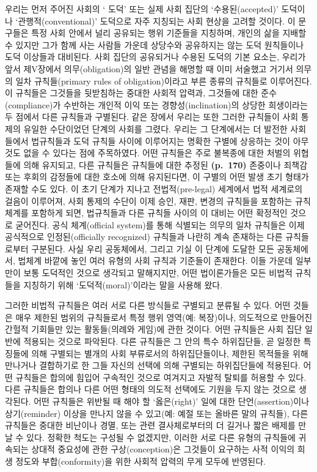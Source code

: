 우리는 먼저 주어진 사회의 ‘ 도덕’ 또는 실제 사회 집단의
‘수용된(accepted)’ 도덕이나 ‘관행적(conventional)’ 도덕으로 자주
지칭되는 사회 현상을 고려할 것이다. 이 문구들은 특정 사회 안에서 널리
공유되는 행위 기준들을 지칭하며, 개인의 삶을 지배할 수 있지만 그가 함께
사는 사람들 가운데 상당수와 공유하지는 않는 도덕 원칙들이나 도덕
이상들과 대비된다. 사회 집단의 공유되거나 수용된 도덕의 기본 요소는,
우리가 앞서 제V장에서 의무(obligation)의 일반 관념을 해명할 때 이미
서술했고 거기서 의무의 일차 규칙들(primary rules of obligation)이라고
부른 종류의 규칙들로 이루어진다. 이 규칙들은 그것들을 뒷받침하는 중대한
사회적 압력과, 그것들에 대한 준수(compliance)가 수반하는 개인적 이익
또는 경향성(inclination)의 상당한 희생이라는 두 점에서 다른 규칙들과
구별된다. 같은 장에서 우리는 또한 그러한 규칙들이 사회 통제의 유일한
수단이었던 단계의 사회를 그렸다. 우리는 그 단계에서는 더 발전한
사회들에서 법규칙들과 도덕 규칙들 사이에 이루어지는 명확한 구별에
상응하는 것이 아무것도 없을 수 있다는 점에 주목하였다. 어떤 규칙들은
주로 불복종에 대한 처벌의 위협들에 의해 유지되고, 다른 규칙들은 규칙들에
대한 추정된 \textbf{(p.~170)} 존중이나 죄책감 또는 후회의 감정들에 대한
호소에 의해 유지된다면, 이 구별의 어떤 발생 초기 형태가 존재할 수도
있다. 이 초기 단계가 지나고 전법적(pre-legal) 세계에서 법적 세계로의
걸음이 이루어져, 사회 통제의 수단이 이제 승인, 재판, 변경의 규칙들을
포함하는 규칙 체계를 포함하게 되면, 법규칙들과 다른 규칙들 사이의 이
대비는 어떤 확정적인 것으로 굳어진다. 공식 체계(official system)를 통해
식별되는 의무의 일차 규칙들은 이제 공식적으로 인정된(officially
recognized) 규칙들과 나란히 계속 존재하는 다른 규칙들로부터 구분된다.
사실 우리 공동체에서, 그리고 기실 이 단계에 도달한 모든 공동체에서,
법체계 바깥에 놓인 여러 유형의 사회 규칙과 기준들이 존재한다. 이들
가운데 일부만이 보통 도덕적인 것으로 생각되고 말해지지만, 어떤
법이론가들은 모든 비법적 규칙들을 지칭하기 위해 ‘도덕적(moral)’이라는
말을 사용해 왔다.

그러한 비법적 규칙들은 여러 서로 다른 방식들로 구별되고 분류될 수 있다.
어떤 것들은 매우 제한된 범위의 규칙들로서 특정 행위 영역(예: 복장)이나,
의도적으로 만들어진 간헐적 기회들만 있는 활동들(의례와 게임)에 관한
것이다. 어떤 규칙들은 사회 집단 일반에 적용되는 것으로 파악된다. 다른
규칙들은 그 안의 특수 하위집단들, 곧 일정한 특징들에 의해 구별되는
별개의 사회 부류로서의 하위집단들이나, 제한된 목적들을 위해 만나거나
결합하기로 한 그들 자신의 선택에 의해 구별되는 하위집단들에 적용된다.
어떤 규칙들은 합의에 힘입어 구속적인 것으로 여겨지고 자발적 탈퇴를
허용할 수 있다. 다른 규칙들은 합의나 다른 어떤 형태의 의도적 선택에도
기원을 두지 않는 것으로 생각된다. 어떤 규칙들은 위반될 때 해야 할
‘옳은(right)’ 일에 대한 단언(assertion)이나 상기(reminder) 이상을 만나지
않을 수 있고(예: 예절 또는 올바른 말의 규칙들), 다른 규칙들은 중대한
비난이나 경멸, 또는 관련 결사체로부터의 더 길거나 짧은 배제를 만날 수
있다. 정확한 척도는 구성될 수 없겠지만, 이러한 서로 다른 유형의 규칙들에
귀속되는 상대적 중요성에 관한 구상(conception)은 그것들이 요구하는 사적
이익의 희생 정도와 부합(conformity)을 위한 사회적 압력의 무게 모두에
반영된다.

